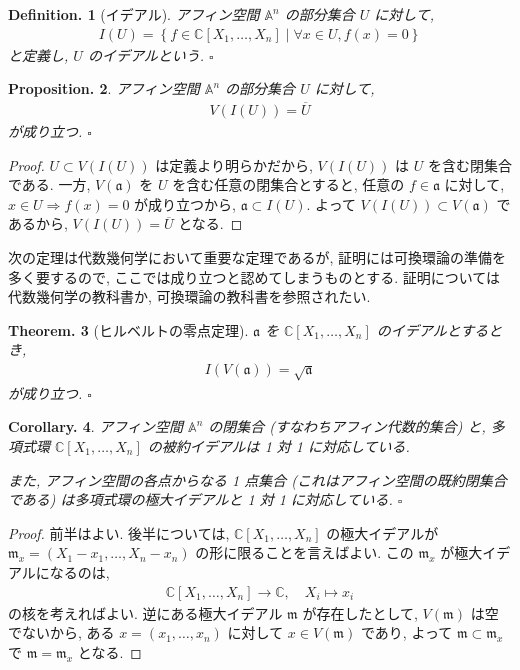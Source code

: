 \documentclass[openany, a4paper, oneside]{jsbook}
\theoremstyle{break}
\newtheorem{thm}{Theorem.}[section]
\newtheorem{cor}[thm]{Corollary.}
\newtheorem{prop}[thm]{Proposition.}
\theoremstyle{breakdefn}
\newtheorem{defn}[thm]{Definition.}
\newcommand{\relmiddle}[1]{\mathrel{}\middle#1\mathrel{}}
\newcommand{\set}[2]{\left\{#1 \relmiddle| #2\right\}}
\newcommand{\fin}{\hfill $\square$ \par}
\begin{document}
\begin{defn}[イデアル]
アフィン空間 $\mathbb{A}^n$ の部分集合 $U$ に対して,
\begin{align}
 I (U)
 =
 \set{f \in \mathbb{C}[X_1, \dots, X_n]}{\forall x \in U, f(x) = 0}
\end{align}
と定義し,  $U$ のイデアルという. \fin
\end{defn}
\begin{prop}
アフィン空間 $\mathbb{A}^n$ の部分集合 $U$ に対して,
\begin{align}
 V ( I ( U ) )
 =
 \overline{U}
\end{align}
が成り立つ. \fin
\end{prop}
\begin{proof}
$U \subset V ( I ( U ) ) $ は定義より明らかだから,
$V ( I ( U ) )$ は $U$ を含む閉集合である.
一方, $V ( \mathfrak{a} )$ を $U$ を含む任意の閉集合とすると,
任意の $f \in \mathfrak{a}$ に対して, $x \in U \Rightarrow f (x) = 0$ が成り立つから,
$ \mathfrak{a} \subset I ( U )$.
よって $V ( I ( U ) ) \subset V ( \mathfrak{a} ) $ であるから,  $V ( I ( U ) ) = \overline{U} $ となる.
\end{proof}

次の定理は代数幾何学において重要な定理であるが,
証明には可換環論の準備を多く要するので, ここでは成り立つと認めてしまうものとする.
証明については代数幾何学の教科書か, 可換環論の教科書を参照されたい.
\begin{thm}[ヒルベルトの零点定理]
 $\mathfrak{a}$ を $\mathbb{C}[X_1, \dots, X_n]$ のイデアルとするとき,
 \begin{align}
  I (V ( \mathfrak{a} ) )
  =
  \sqrt{ \mathfrak{a} }
 \end{align}
が成り立つ. \fin
\end{thm}
\begin{cor}\label{waheyhey-algebraic-geometry-guidance3}
 アフィン空間 $\mathbb{A}^n$ の閉集合 (すなわちアフィン代数的集合) と,
 多項式環 $\mathbb{C}[X_1, \dots, X_n]$ の被約イデアルは 1 対 1 に対応している.

 また, アフィン空間の各点からなる 1 点集合 (これはアフィン空間の既約閉集合である) は多項式環の極大イデアルと 1 対 1 に対応している. \fin
\end{cor}
\begin{proof}
前半はよい.
後半については, $\mathbb{C}[X_1, \dots, X_n]$ の極大イデアルが
$\mathfrak{m}_x = (X_1 - x_1, \dots, X_n - x_n)$ の形に限ることを言えばよい.
この $\mathfrak{m}_x$ が極大イデアルになるのは,
\begin{align}
 \mathbb{C}[X_1, \dots, X_n]
 \longrightarrow
 \mathbb{C}, \quad X_i \mapsto x_i
\end{align}
の核を考えればよい.
逆にある極大イデアル $\mathfrak{m}$ が存在したとして, $V ( \mathfrak{m} )$ は空でないから,
ある $x = (x_1, \dots, x_n)$ に対して $x \in V ( \mathfrak{m} )$ であり,
よって $ \mathfrak{m} \subset \mathfrak{m}_x$ で $ \mathfrak{m} = \mathfrak{m}_x$ となる.
\end{proof}
\end{document}
